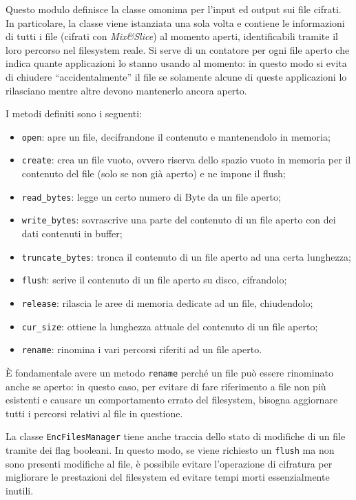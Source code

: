 \documentclass[a4paper,12pt,twoside,openright]{report}
\begin{document}
  Questo modulo definisce la classe omonima per l'input ed output sui file cifrati.
  In particolare, la classe viene istanziata una sola volta e contiene le informazioni di tutti
  i file (cifrati con \textit{Mix\&Slice}) al momento aperti, identificabili tramite il loro
  percorso nel filesystem reale.
  Si serve di un contatore per ogni file aperto che indica quante applicazioni lo stanno
  usando al momento: in questo modo si evita di chiudere ``accidentalmente'' il file se solamente
  alcune di queste applicazioni lo rilasciano mentre altre devono mantenerlo ancora aperto.

  I metodi definiti sono i seguenti:

  \begin{itemize}
    \item \texttt{open}: apre un file, decifrandone il contenuto e mantenendolo in memoria;
    \item \texttt{create}: crea un file vuoto, ovvero riserva dello spazio vuoto in memoria per il contenuto del file
      (solo se non già aperto) e ne impone il flush;
    \item \texttt{read\_bytes}: legge un certo numero di Byte da un file aperto;
    \item \texttt{write\_bytes}: sovrascrive una parte del contenuto di un file aperto con dei dati contenuti in buffer;
    \item \texttt{truncate\_bytes}: tronca il contenuto di un file aperto ad una certa lunghezza;
    \item \texttt{flush}: scrive il contenuto di un file aperto su disco, cifrandolo;
    \item \texttt{release}: rilascia le aree di memoria dedicate ad un file, chiudendolo;
    \item \texttt{cur\_size}: ottiene la lunghezza attuale del contenuto di un file aperto;
    \item \texttt{rename}: rinomina i vari percorsi riferiti ad un file aperto.
  \end{itemize}

  È fondamentale avere un metodo \texttt{rename} perché un file può essere rinominato anche se aperto:
  in questo caso, per evitare di fare riferimento a file non più esistenti e causare un comportamento
  errato del filesystem, bisogna aggiornare tutti i percorsi relativi al file in questione.

  La classe \texttt{EncFilesManager} tiene anche traccia dello stato di modifiche di un file tramite dei flag booleani.
  In questo modo, se viene richiesto un \texttt{flush} ma non sono presenti modifiche al file, è possibile
  evitare l'operazione di cifratura per migliorare le prestazioni del filesystem ed evitare tempi morti essenzialmente inutili.
\end{document}
